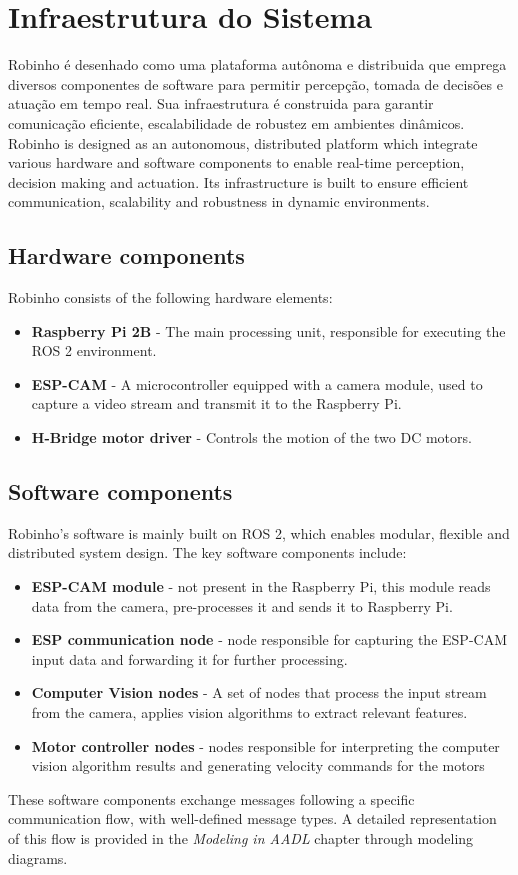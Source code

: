 \chapter{Infraestrutura do Sistema}
\label{cap:infra}
Robinho é desenhado como uma plataforma autônoma e distribuida que emprega diversos componentes de software para permitir percepção, tomada de decisões e atuação em tempo real. Sua infraestrutura é construida para garantir comunicação eficiente, escalabilidade de robustez em ambientes dinâmicos.
Robinho is designed as an autonomous, distributed platform which integrate various hardware and software components to enable real-time perception, decision making and actuation. Its infrastructure is built to ensure efficient communication, scalability and robustness in dynamic environments.
\section{Hardware components}
Robinho consists of the following hardware elements: 
\begin{itemize}
    \item \textbf{Raspberry Pi 2B} - The main processing unit, responsible for executing the ROS 2 environment.
    \item \textbf{ESP-CAM} - A microcontroller equipped with a camera module, used to capture a video stream and transmit it to the Raspberry Pi.
    \item \textbf{H-Bridge motor driver} - Controls the motion of the two DC motors.
\end{itemize}

\section{Software components}
Robinho's software is mainly built on ROS 2, which enables modular, flexible and distributed system design. The key software components include:
\begin{itemize}
    \item \textbf{ESP-CAM module} - not present in the Raspberry Pi, this module reads data from the camera, pre-processes it and sends it to Raspberry Pi.
    \item \textbf{ESP communication node} - node responsible for capturing the ESP-CAM input data and forwarding it for further processing.
    \item \textbf{Computer Vision nodes} - A set of nodes that process the input stream from the camera, applies vision algorithms to extract relevant features.
    \item \textbf{Motor controller nodes} - nodes responsible for interpreting the computer vision algorithm results and generating velocity commands for the motors
\end{itemize}
These software components exchange messages following a specific communication flow, with well-defined message types. A detailed representation of this flow is provided in the \textit{Modeling in AADL} chapter through modeling diagrams.

